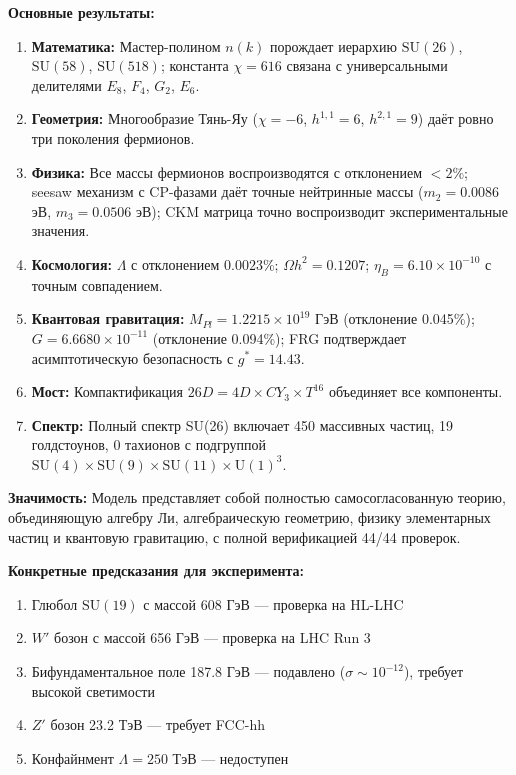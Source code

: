 \documentclass[12pt,a4paper,twoside]{article}
\newcommand{\SU}{\mathrm{SU}}
\newcommand{\Uone}{\mathrm{U}(1)}
\theoremstyle{definition}
\begin{document}
\textbf{Основные результаты:}

\begin{enumerate}
    \item \textbf{Математика:} Мастер-полином $n(k)$ порождает иерархию $\SU(26)$, $\SU(58)$, $\SU(518)$; константа $\chi = 616$ связана с универсальными делителями $E_8$, $F_4$, $G_2$, $E_6$.
    
    \item \textbf{Геометрия:} Многообразие Тянь-Яу ($\chi = -6$, $h^{1,1} = 6$, $h^{2,1} = 9$) даёт ровно три поколения фермионов.
    
    \item \textbf{Физика:} Все массы фермионов воспроизводятся с отклонением $< 2\%$; seesaw механизм с CP-фазами даёт точные нейтринные массы ($m_2 = 0.0086$ эВ, $m_3 = 0.0506$ эВ); CKM матрица точно воспроизводит экспериментальные значения.
    
    \item \textbf{Космология:} $\Lambda$ с отклонением $0.0023\%$; $\Omega h^2 = 0.1207$; $\eta_B = 6.10 \times 10^{-10}$ с точным совпадением.
    
    \item \textbf{Квантовая гравитация:} $M_{Pl} = 1.2215 \times 10^{19}$ ГэВ (отклонение 0.045\%); $G = 6.6680 \times 10^{-11}$ (отклонение 0.094\%); FRG подтверждает асимптотическую безопасность с $g^* = 14.43$.
    
    \item \textbf{Мост:} Компактификация $26D = 4D \times CY_3 \times T^{16}$ объединяет все компоненты.
    
    \item \textbf{Спектр:} Полный спектр SU(26) включает 450 массивных частиц, 19 голдстоунов, 0 тахионов с подгруппой $\SU(4) \times \SU(9) \times \SU(11) \times \Uone^3$.
\end{enumerate}

\textbf{Значимость:} Модель представляет собой полностью самосогласованную теорию, объединяющую алгебру Ли, алгебраическую геометрию, физику элементарных частиц и квантовую гравитацию, с полной верификацией 44/44 проверок.

\textbf{Конкретные предсказания для эксперимента:}

\begin{enumerate}
    \item Глюбол $\SU(19)$ с массой 608 ГэВ — проверка на HL-LHC
    \item $W'$ бозон с массой 656 ГэВ — проверка на LHC Run 3
    \item Бифундаментальное поле 187.8 ГэВ — подавлено ($\sigma \sim 10^{-12}$), требует высокой светимости
    \item $Z'$ бозон 23.2 ТэВ — требует FCC-hh
    \item Конфайнмент $\Lambda = 250$ ТэВ — недоступен
\end{enumerate}
\end{document}
